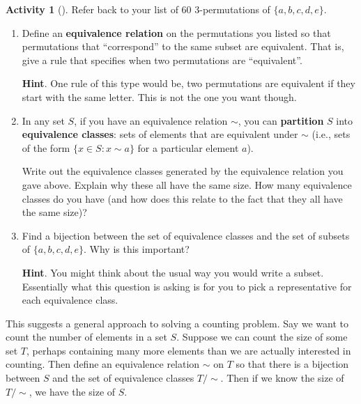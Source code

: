 \documentclass[10pt,]{book}
\newcommand{\terminology}[1]{\textbf{#1}}
\theoremstyle{plain}
\theoremstyle{definition}
\theoremstyle{definition}
\theoremstyle{definition}
\newtheorem{activity}[project]{Activity}
\theoremstyle{definition}
\numberwithin{equation}{chapter}
\def\st{:}
\begin{document}
\begin{activity}[]\label{activity-52}
\hypertarget{p-655}{}%
Refer back to your list of 60 3-permutations of \(\{a,b,c,d,e\}\).%
\begin{enumerate}[font=\bfseries,label=(\alph*),ref=\alph*]
\item\label{task-73} \hypertarget{p-656}{}%
Define an \terminology{equivalence relation} on the permutations you listed so that permutations that ``correspond'' to the same subset are equivalent.  That is, give a rule that specifies when two permutations are ``equivalent''.%
\par\smallskip%
\noindent\textbf{Hint}.\hypertarget{hint-38}{}\quad%
\hypertarget{p-657}{}%
One rule of this type would be, two permutations are equivalent if they start with the same letter.  This is not the one you want though.%
\item\label{task-74} \hypertarget{p-658}{}%
In any set \(S\), if you have an equivalence relation \(\sim\), you can \terminology{partition} \(S\) into \terminology{equivalence classes}: sets of elements that are equivalent under \(\sim\) (i.e., sets of the form \(\{x \in S \st x \sim a\} \) for a particular element \(a\)).%
\par
\hypertarget{p-659}{}%
Write out the equivalence classes generated by the equivalence relation you gave above.  Explain why these all have the same size.  How many equivalence classes do you have (and how does this relate to the fact that they all have the same size)?%
\item\label{task-75} \hypertarget{p-660}{}%
Find a bijection between the set of equivalence classes and the set of subsets of \(\{a,b,c,d,e\}\).  Why is this important?%
\par\smallskip%
\noindent\textbf{Hint}.\hypertarget{hint-39}{}\quad%
\hypertarget{p-661}{}%
You might think about the usual way you would write a subset.  Essentially what this question is asking is for you to pick a representative for each equivalence class.%
\end{enumerate}
\end{activity}
\hypertarget{p-662}{}%
This suggests a general approach to solving a counting problem.  Say we want to count the number of elements in a set \(S\).  Suppose we can count the size of some set \(T\), perhaps containing many more elements than we are actually interested in counting.  Then define an equivalence relation \(\sim\) on \(T\) so that there is a bijection between \(S\) and the set of equivalence classes \(T/\sim\).  Then if we know the size of \(T/\sim\), we have the size of \(S\).%
\end{document}
